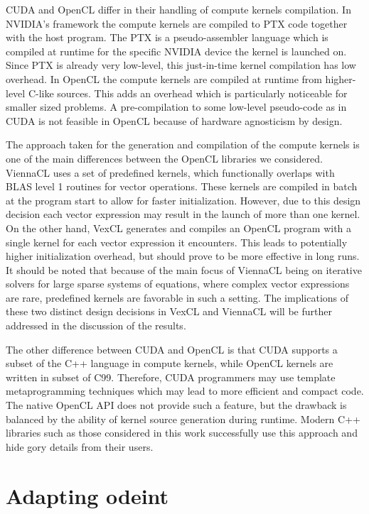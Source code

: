 \documentclass[final]{siamltex}
\begin{document}
CUDA and OpenCL differ in their handling of compute kernels compilation. In
NVIDIA's framework the compute kernels are compiled to PTX code together with
the host program. The PTX is a pseudo-assembler language which is compiled at
runtime for the specific NVIDIA device the kernel is launched on. Since PTX is already
very low-level, this just-in-time kernel compilation has low overhead. In
OpenCL the compute kernels are compiled at runtime from higher-level C-like sources.
This adds an overhead which is particularly noticeable for smaller sized
problems. A pre-compilation to some low-level pseudo-code as in CUDA is not feasible in
OpenCL because of hardware agnosticism by design.

The approach taken for the generation and compilation of the compute kernels is one of the
main differences between the OpenCL libraries we considered.
ViennaCL uses a set of predefined kernels, which functionally overlaps with BLAS level
1 routines for vector operations.
These kernels are compiled in batch at the program start to allow
for faster initialization. However, due to this design decision each vector
expression may result in the launch of more than one kernel.  On the other hand,
VexCL generates and compiles an OpenCL program with a single kernel for each
vector expression it encounters.  This leads to potentially higher
initialization overhead, but should prove to be more effective in long
runs. It should be noted that because of the main focus of ViennaCL being on iterative
solvers for large sparse systems of equations, where complex vector
expressions are rare, predefined kernels are favorable in such a setting.
The implications of these two distinct design decisions in VexCL and ViennaCL will be further addressed in the discussion of the results.

The other difference between CUDA and OpenCL is that CUDA supports a subset of the
C++ language in compute kernels, while OpenCL kernels are written in subset of
C99. Therefore, CUDA programmers may use template metaprogramming techniques
which may lead to more efficient and compact code. The native OpenCL API does not
provide such a feature, but the drawback is balanced by the ability of
kernel source generation during runtime. Modern C++ libraries such as those considered in
this work successfully use this approach and hide gory details from their
users.




%
%
\section{Adapting odeint} \label{sec:adapting-odeint}
\end{document}
